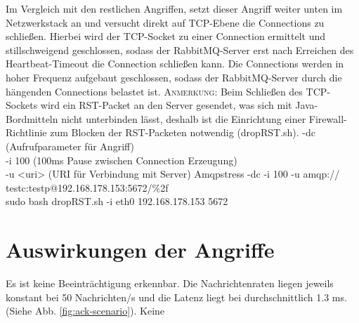 \documentclass[	a4paper,
			11pt,
			oneside,
			parskip]{scrartcl}
\begin{document}
		{%
		 Im Vergleich mit den restlichen Angriffen, setzt dieser Angriff weiter unten im Netzwerkstack an und versucht direkt auf TCP-Ebene die Connections zu schließen. Hierbei wird der TCP-Socket zu einer 
		 Connection ermittelt und stillschweigend geschlossen, sodass der RabbitMQ-Server erst nach Erreichen des Heartbeat-Timeout die Connection schließen kann. Die Connections werden in hoher Frequenz aufgebaut
		 geschlossen, sodass der RabbitMQ-Server durch die hängenden Connections belastet ist. \medskip\newline
		 \textsc{Anmerkung:} Beim Schließen des TCP-Sockets wird ein RST-Packet an den Server gesendet, was sich mit Java-Bordmitteln nicht unterbinden lässt, deshalb ist die Einrichtung einer Firewall-Richtlinie zum
		 Blocken der RST-Packeten notwendig (dropRST.sh)\footnotemark[5].
		}{%
		 -dc (Aufrufparameter für Angriff) \\
		 -i 100 (100ms Pause zwischen Connection Erzeugung) \\
		 -u <uri> (URI für Verbindung mit Server)
		}{%
		 Amqpstress -dc -i 100 -u amqp://\\\hspace*{3cm}testc:testp@192.168.178.153:5672/\%2f\\
		 sudo bash dropRST.sh -i eth0 192.168.178.153 5672
		}


%	
%
\clearpage
\section*{Auswirkungen der Angriffe}
	
		{%
		  \newline
		  \newline
		  \newline
		}{%
		 Es ist keine Beeinträchtigung erkennbar. Die Nachrichtenraten liegen jeweils konstant bei 50 Nachrichten/s und die Latenz liegt bei durchschnittlich 1.3 ms.
		 (Siehe Abb. \ref{fig:ack-scenario}).
		}{%
		 Keine
		}
		
\end{document}
